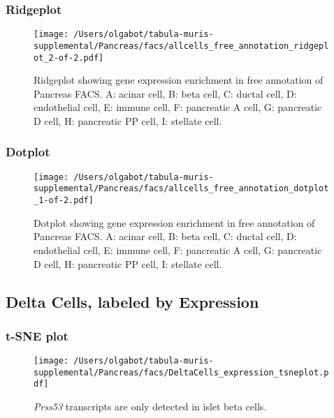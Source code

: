 \newpage
\newpage
\subsubsection{Ridgeplot}
\begin{figure}[h]
\centering
\texttt{[image: /Users/olgabot/tabula-muris-supplemental/Pancreas/facs/allcells\_free\_annotation\_ridgeplot\_2-of-2.pdf]}

\caption{ Ridgeplot  showing gene expression enrichment in free annotation of Pancreas FACS. A: acinar cell, B: beta cell, C: ductal cell, D: endothelial cell, E: immune cell, F: pancreatic A cell, G: pancreatic D cell, H: pancreatic PP cell, I: stellate cell.}
\end{figure}


\newpage
\newpage
\subsubsection{Dotplot}
\begin{figure}[h]
\centering
\texttt{[image: /Users/olgabot/tabula-muris-supplemental/Pancreas/facs/allcells\_free\_annotation\_dotplot\_1-of-2.pdf]}

\caption{ Dotplot  showing gene expression enrichment in free annotation of Pancreas FACS. A: acinar cell, B: beta cell, C: ductal cell, D: endothelial cell, E: immune cell, F: pancreatic A cell, G: pancreatic D cell, H: pancreatic PP cell, I: stellate cell.}
\end{figure}


\newpage
\subsection{Delta Cells, labeled by Expression}

\subsubsection{t-SNE plot}
\begin{figure}[h]
\centering
\texttt{[image: /Users/olgabot/tabula-muris-supplemental/Pancreas/facs/DeltaCells\_expression\_tsneplot.pdf]}

\caption{\emph{Prss53} transcripts are only detected in islet beta cells.
}
\end{figure}

